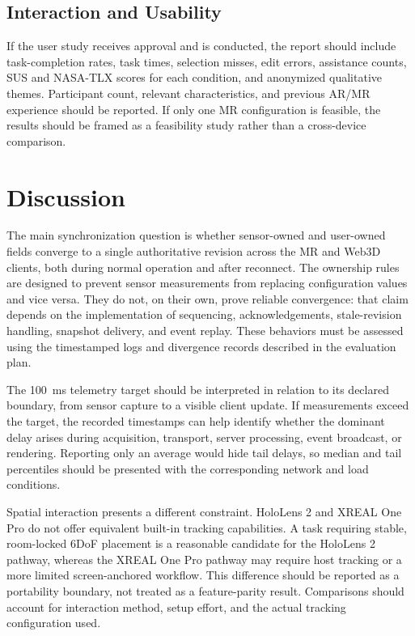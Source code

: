 \documentclass[conference]{IEEEtran}
\begin{document}
\subsection{Interaction and Usability}
If the user study receives approval and is conducted, the report should include task-completion rates, task times, selection misses, edit errors, assistance counts, SUS and NASA-TLX scores for each condition, and anonymized qualitative themes. Participant count, relevant characteristics, and previous AR/MR experience should be reported. If only one MR configuration is feasible, the results should be framed as a feasibility study rather than a cross-device comparison.

\section{Discussion}
The main synchronization question is whether sensor-owned and user-owned fields converge to a single authoritative revision across the MR and Web3D clients, both during normal operation and after reconnect. The ownership rules are designed to prevent sensor measurements from replacing configuration values and vice versa. They do not, on their own, prove reliable convergence: that claim depends on the implementation of sequencing, acknowledgements, stale-revision handling, snapshot delivery, and event replay. These behaviors must be assessed using the timestamped logs and divergence records described in the evaluation plan.

The 100~ms telemetry target should be interpreted in relation to its declared boundary, from sensor capture to a visible client update. If measurements exceed the target, the recorded timestamps can help identify whether the dominant delay arises during acquisition, transport, server processing, event broadcast, or rendering. Reporting only an average would hide tail delays, so median and tail percentiles should be presented with the corresponding network and load conditions.

Spatial interaction presents a different constraint. HoloLens 2 and XREAL One Pro do not offer equivalent built-in tracking capabilities. A task requiring stable, room-locked 6DoF placement is a reasonable candidate for the HoloLens 2 pathway, whereas the XREAL One Pro pathway may require host tracking or a more limited screen-anchored workflow. This difference should be reported as a portability boundary, not treated as a feature-parity result. Comparisons should account for interaction method, setup effort, and the actual tracking configuration used.
\end{document}
